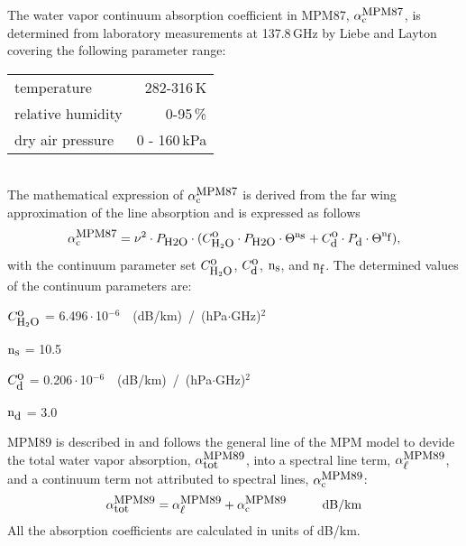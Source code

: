 \label{levele:mpm87_h2ocont}
The water vapor continuum absorption coefficient in MPM87, $\alpha^{\mbox{\rm \small MPM87}}_{\rm c}$, 
is determined from laboratory measurements at 137.8\,GHz by Liebe 
and Layton covering the following parameter range:\\
\begin{tabular}{lr}
temperature          & 282-316\,K\\
relative humidity    & 0-95\,\%\\
dry air pressure     & 0 - 160\,kPa\\ 
\end{tabular}\\
The mathematical expression of $\alpha^{\mbox{\rm \small MPM87}}_{\rm c}$ is derived from the far wing 
approximation of the line absorption and is expressed as follows
\begin{equation} 
  \label{eq:mpm87:cont}
  \alpha^{\mbox{\rm \small MPM87}}_{\rm c} = \nu^2 \cdot P_{\mbox{\rm \small H2O}} \cdot 
                (C^{\mbox{\rm o}}_{\mbox{\rm \small H}_{2}\mbox{\rm \small O}} \cdot P_{\mbox{\rm \small H2O}} \cdot \Theta^{{\rm n}_{\mbox{\rm \small s}}} + 
                 C^{\mbox{\rm o}}_{\mbox{\rm \small d}} \cdot P_{\mbox{\rm \small d}}  \cdot \Theta^{{\rm n}_{\mbox{\rm \small f}}}),
\end{equation}
with the continuum parameter set $C^{\mbox{\rm o}}_{\mbox{\rm \small H}_{2}\mbox{\rm \small O}}$, $C^{\mbox{\rm o}}_{\mbox{\rm \small d}}$, ${\rm n}_{\mbox{\rm \small s}}$, and ${\rm n}_{\mbox{\rm \small f}}$. 
The determined values of the continuum parameters are:

\begin{description}
\item{$C^{\mbox{\rm o}}_{\mbox{\rm \small H}_{2}\mbox{\rm \small O}}$}   =  6.496\,$\cdot$\,10$^{-6}$~~(dB/km)~/~(hPa$\cdot$GHz)$^2$
\item{${\rm n}_{\mbox{\rm \small s}}$}    = 10.5
\item{$C^{\mbox{\rm o}}_{\mbox{\rm \small d}}$}   =  0.206\,$\cdot$\,10$^{-6}$~~(dB/km)~/~(hPa$\cdot$GHz)$^2$
\item{${\rm n}_{\mbox{\rm \small d}}$}    =  3.0
\end{description}




\label{leveld:mpm89}
%
MPM89 is described in \cite{liebe:89} and follows the general line 
of the MPM model to devide the total water vapor absorption, 
$\alpha^{\mbox{\rm \small MPM89}}_{\mbox{\small tot}}$, into a spectral line term, $\alpha^{\mbox{\rm \small MPM89}}_{\mbox{\small $\ell$}}$, and a continuum 
term not attributed to spectral lines, $\alpha^{\mbox{\rm \small MPM89}}_{\rm c}$:
\begin{equation}
  \label{eq:mpm89_abs}
  \alphampmmtot = \alphampmml + \alphampmmc\hspace*{10mm}\mbox{dB/km}
\end{equation}
All the absorption coefficients are calculated in units of \mbox{dB/km}.


